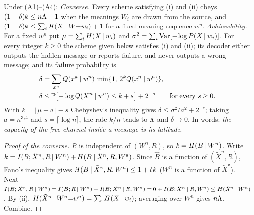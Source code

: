 \begin{theorem}\label{thm:channel}
Under (A1)--(A4):
\emph{Converse.} Every scheme satisfying (i) and (ii) obeys $(1-\delta)k\le n\Lambda+1$ when the meanings $W_i$ are drawn from the source, and $(1-\delta)k\le\sum_iH(X\mathbin{\vert} W{=}w_i)+1$ for a fixed meaning sequence $w^n$.
\emph{Achievability.} For a fixed $w^n$ put $\mu=\sum_iH(X\mathbin{\vert} w_i)$ and $\sigma^2=\sum_i\operatorname{Var}[-\log P(X\mathbin{\vert} w_i)]$. For every integer $k\ge0$ the scheme given below satisfies (i) and (ii); its decoder either outputs the hidden message or reports failure, and never outputs a wrong message; and its failure probability is
\begin{align}
\delta&=\sum_{x^n}Q(x^n\mathbin{\vert} w^n)\,\min\{1,\,2^{k}Q(x^n\mathbin{\vert} w^n)\},\\
\delta&\le\mathbb{P}\bigl[-\log Q(X^n\mathbin{\vert} w^n)\le k+s\bigr]+2^{-s}\qquad\text{for every }s\ge0 .
\end{align}
With $k=\lfloor\mu-a\rfloor-s$ Chebyshev's inequality gives $\delta\le\sigma^2/a^2+2^{-s}$; taking $a=n^{3/4}$ and $s=\lceil\log n\rceil$, the rate $k/n$ tends to $\Lambda$ and $\delta\to0$. In words: \emph{the capacity of the free channel inside a message is its latitude.}
\end{theorem}
\begin{proof}[Proof of the converse]
$B$ is independent of $(W^n,R)$, so $k=H(B\mathbin{\vert} W^n)$. Write $k=I(B;\tilde X^n,R\mathbin{\vert} W^n)+H(B\mathbin{\vert}\tilde X^n,R,W^n)$. Since $\hat B$ is a function of $(\tilde X^n,R)$, Fano's inequality gives $H(B\mathbin{\vert}\tilde X^n,R,W^n)\le1+\delta k$ ($W^n$ is a function of $\tilde X^n$). Next $I(B;\tilde X^n,R\mathbin{\vert} W^n)=I(B;R\mathbin{\vert} W^n)+I(B;\tilde X^n\mathbin{\vert} R,W^n)=0+I(B;\tilde X^n\mathbin{\vert} R,W^n)\le H(\tilde X^n\mathbin{\vert} W^n)$. By (ii), $H(\tilde X^n\mathbin{\vert} W^n{=}w^n)=\sum_iH(X\mathbin{\vert} w_i)$; averaging over $W^n$ gives $n\Lambda$. Combine.
\end{proof}

